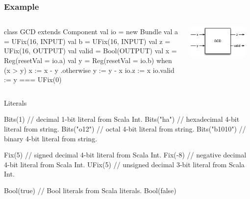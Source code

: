 \documentclass[xcolor=pdflatex,dvipsnames,table]{beamer}
\begin{document}
\begin{frame}[fragile]
\frametitle{Example}
\begin{columns}


\begin{footnotesize}
\begin{scala}
class GCD extends Component {
  val io = new Bundle {
    val a     = UFix(16, INPUT)
    val b     = UFix(16, INPUT)
    val z     = UFix(16, OUTPUT)
    val valid = Bool(OUTPUT) }
  val x = Reg(resetVal = io.a)
  val y = Reg(resetVal = io.b)
  when (x > y) {
    x := x - y
  } .otherwise {
    y := y - x
  }
  io.z     := x
  io.valid := y === UFix(0)
}
\end{scala}
\end{footnotesize}


\begin{center}
\includegraphics[width=0.9\textwidth]{figs/gcd.pdf} 
\end{center}

\end{columns}
\end{frame}


\begin{frame}[fragile]{Literals}
\begin{scala}
Bits(1)       // decimal 1-bit literal from Scala Int. 
Bits("ha")    // hexadecimal 4-bit literal from string.
Bits("o12")   // octal 4-bit literal from string. 
Bits("b1010") // binary 4-bit literal from string.

Fix(5)        // signed decimal 4-bit literal from Scala Int.
Fix(-8)       // negative decimal 4-bit literal from Scala Int.
UFix(5)       // unsigned decimal 3-bit literal from Scala Int.

Bool(true)    // Bool literals from Scala literals.
Bool(false)
\end{scala}
\end{frame}
 
\end{document}
